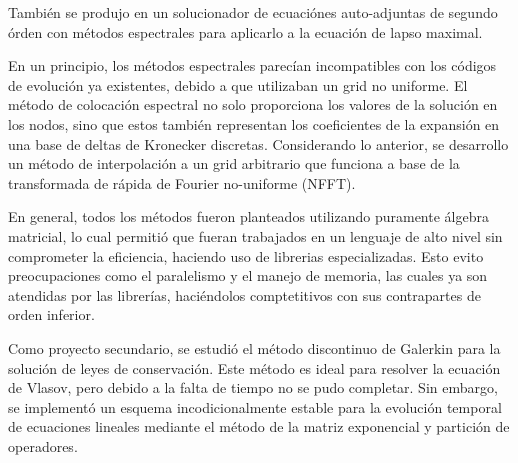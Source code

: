 \documentclass[12pt]{article}
\begin{document}
También se produjo en un solucionador de ecuaciónes auto-adjuntas de segundo órden con métodos espectrales para aplicarlo a la ecuación de lapso maximal.

En un principio, los métodos espectrales parecían incompatibles con los códigos de evolución ya existentes, debido a que utilizaban un grid no uniforme. El método de colocación espectral no solo proporciona los valores de la solución en los nodos, sino que estos también representan los coeficientes de la expansión en una base de deltas de Kronecker discretas. Considerando lo anterior, se desarrollo un método de interpolación a un grid arbitrario que funciona a base de la transformada de rápida de Fourier no-uniforme (NFFT).

En general, todos los métodos fueron planteados utilizando puramente álgebra matricial, lo cual permitió que fueran trabajados en un lenguaje de alto nivel sin comprometer la eficiencia, haciendo uso de librerias especializadas. Esto evito preocupaciones como el paralelismo y el manejo de memoria, las cuales ya son atendidas por las librerías, haciéndolos comptetitivos con sus contrapartes de orden inferior.

Como proyecto secundario, se estudió el método discontinuo de Galerkin para la solución de leyes de conservación. Este método es ideal para resolver la ecuación de Vlasov, pero debido a la falta de tiempo no se pudo completar. Sin embargo, se implementó un esquema incodicionalmente estable para la evolución temporal de ecuaciones lineales mediante el método de la matriz exponencial y partición de operadores.
\end{document}
